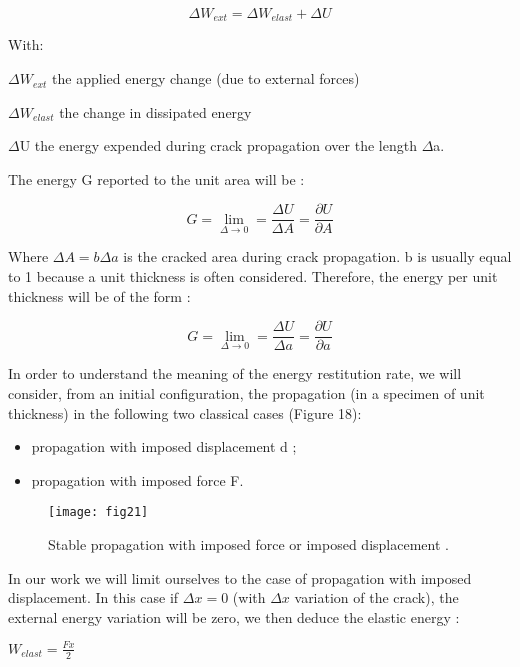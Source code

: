 \begin{equation}
	\Delta W_{ext}=\Delta W_{elast}+\Delta U
\end{equation}

With:

$\Delta W_{ext}$ the applied energy change (due to external forces)

$\Delta W_{elast}$ the change in dissipated energy 

$\Delta$U the energy expended during crack propagation over the length $\Delta$a.

The energy G reported to the unit area will be :

\begin{equation}
	G = \lim_{\Delta \to 0}= \frac{\Delta U}{\Delta A}= \frac{\partial U}{\partial A}
\end{equation}

Where $\Delta A=b\Delta a$  is the cracked area during crack propagation. b is usually equal to 1 because a unit thickness is often considered. Therefore, the energy per unit thickness will be of the form :

\begin{equation}
	G = \lim_{\Delta \to 0}= \frac{\Delta U}{\Delta a}= \frac{\partial U}{\partial a}
\end{equation}

In order to understand the meaning of the energy restitution rate, we will consider, from an initial configuration, the propagation (in a specimen of unit thickness) in the following two classical cases (Figure 18):

\begin{itemize}
	\item propagation with imposed displacement d ; 
	\item propagation with imposed force F.
\end{itemize}

\begin{figure}[htp]
	\centering
	\texttt{[image: fig21]}
	\caption{Stable propagation with imposed force or imposed displacement \cite{Zeghloul2001phd}.}
	\label{fig:fig21}
\end{figure}

In our work we will limit ourselves to the case of propagation with imposed displacement. In this case if $\Delta x=0$ (with $\Delta x$ variation of the crack), the external energy variation will be zero, we then deduce the elastic energy :

$W_{elast}=\frac{Fx}{2}$

